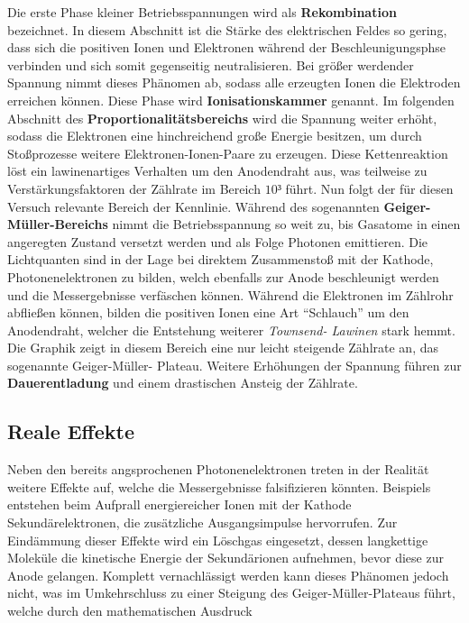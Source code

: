 \noindent Die erste Phase kleiner Betriebsspannungen wird als \textbf{Rekombination} bezeichnet. In diesem Abschnitt ist die 
Stärke des elektrischen Feldes so gering, dass sich die positiven Ionen und Elektronen während der Beschleunigungsphse verbinden
und sich somit gegenseitig neutralisieren. Bei größer werdender Spannung nimmt dieses Phänomen ab, sodass alle erzeugten 
Ionen die Elektroden erreichen können. Diese Phase wird \textbf{Ionisationskammer} genannt. Im folgenden Abschnitt des 
\textbf{Proportionalitätsbereichs} wird die Spannung weiter erhöht, sodass die Elektronen eine hinchreichend große Energie 
besitzen, um durch Stoßprozesse weitere Elektronen-Ionen-Paare zu erzeugen. Diese Kettenreaktion löst ein lawinenartiges 
Verhalten um den Anodendraht aus, was teilweise zu Verstärkungsfaktoren der Zählrate im Bereich $10³$ führt. Nun folgt der 
für diesen Versuch relevante Bereich der Kennlinie. Während des sogenannten \textbf{Geiger-Müller-Bereichs} nimmt die 
Betriebsspannung so weit zu, bis Gasatome in einen angeregten Zustand versetzt werden und als Folge Photonen emittieren. 
Die Lichtquanten sind in der Lage bei direktem Zusammenstoß mit der Kathode, Photonenelektronen zu bilden, welch ebenfalls
zur Anode beschleunigt werden und die Messergebnisse verfäschen können. Während die Elektronen im Zählrohr abfließen können,
bilden die positiven Ionen eine Art \enquote{Schlauch} um den Anodendraht, welcher die Entstehung weiterer \emph{Townsend-
Lawinen} stark hemmt. Die Graphik zeigt in diesem Bereich eine nur leicht steigende Zählrate an, das sogenannte Geiger-Müller-
Plateau. Weitere Erhöhungen der Spannung führen zur \textbf{Dauerentladung} und einem drastischen Ansteig der Zählrate.

\subsection{Reale Effekte}

Neben den bereits angsprochenen Photonenelektronen treten in der Realität weitere Effekte auf, welche die Messergebnisse 
falsifizieren könnten. Beispiels entstehen beim Aufprall energiereicher Ionen mit der Kathode Sekundärelektronen, die 
zusätzliche Ausgangsimpulse hervorrufen. Zur Eindämmung dieser Effekte wird ein Löschgas eingesetzt, dessen langkettige
Moleküle die kinetische Energie der Sekundärionen aufnehmen, bevor diese zur Anode gelangen. Komplett vernachlässigt werden 
kann dieses Phänomen jedoch nicht, was im Umkehrschluss zu einer Steigung des Geiger-Müller-Plateaus führt, welche durch 
den mathematischen Ausdruck

